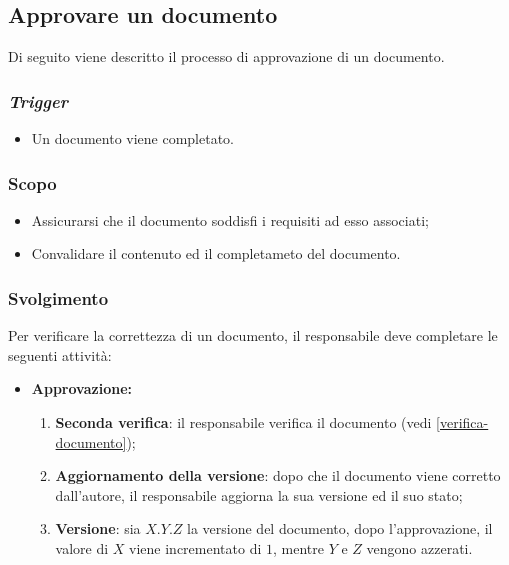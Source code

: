 \subsection{Approvare un documento}
\label{approvazione-documento}
Di seguito viene descritto il processo di approvazione di un documento.

\subsubsection{\textit{Trigger}}
\begin{itemize}
	\item Un documento viene completato.
\end{itemize}

\subsubsection{Scopo}
\begin{itemize}
	\item Assicurarsi che il documento soddisfi i requisiti ad esso associati;

	\item Convalidare il contenuto ed il completameto del documento.
\end{itemize}

\subsubsection{Svolgimento}

Per verificare la correttezza di un documento, il responsabile deve completare
le seguenti attività:
\begin{itemize}
	\item \textbf{Approvazione:}
	      \begin{enumerate}
		      \item \textbf{Seconda verifica}: il responsabile verifica il
		            documento (vedi \autoref{verifica-documento});

		      \item \textbf{Aggiornamento della versione}: dopo che il documento
		            viene corretto dall'autore, il responsabile aggiorna la
		            sua versione ed il suo stato;

		      \item \textbf{Versione}: sia $X.Y.Z$ la versione del documento,
		            dopo l'approvazione, il valore di $X$ viene incrementato di
		            $1$, mentre $Y$ e $Z$ vengono azzerati.
	      \end{enumerate}
\end{itemize}
